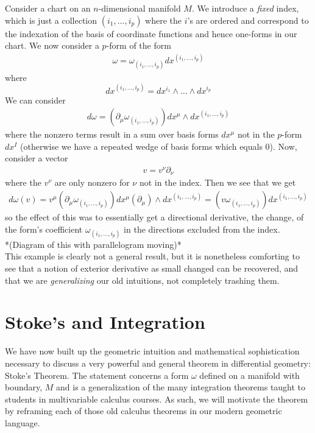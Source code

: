   Consider a chart on an $n$-dimensional manifold $M$.  We introduce a \textit{fixed} index, which is just a collection $(i_1, \dots, i_p)$ where the $i$'s are ordered and correspond to the indexation of the basis of coordinate functions and hence one-forms in our chart.  We now consider a $p$-form of the form
  \begin{align*}
  	\omega = \omega_{(i_1, \dots, i_p)} dx^{(i_1, \dots, i_p)}
  \end{align*}
  where 
  \begin{equation*}
  	dx^{(i_1, \dots, i_p)} = dx^{i_1}\wedge \dots \wedge dx^{i_p}
  \end{equation*}
  We can consider 
  \begin{align*}
  	d\omega = (\partial_\mu\omega_{(i_1, \dots, i_p)})dx^\mu \wedge dx^{(i_1, \dots, i_p)}
  \end{align*}
  where the nonzero terms result in a sum over basis forms $dx^\mu$ not in the $p$-form $dx^I$ (otherwise we have a repeated wedge of basis forms which equals 0).  Now, consider a vector 
  \begin{align*}
  	v = v^\nu\partial_\nu
  \end{align*}
 where the $v^\nu$ are only nonzero for $\nu$ not in the index.  Then we see that we get
 \begin{align*}
 	d\omega(v) = v^\mu(\partial_\mu \omega_{(i_1, \dots, i_p)})dx^\mu(\partial_\mu)\wedge dx^{(i_1, \dots, i_p)}  = (v \omega_{(i_1, \dots, i_p)})dx^{(i_1, \dots, i_p)}
 \end{align*}
 so the effect of this was to essentially get a directional derivative, the change, of the form's coefficient $\omega_{(i_1, \dots, i_p)}$ in the directions excluded from the index.\\   
 
 *(Diagram of this with parallelogram moving)*\\
 
 This example is clearly not a general result, but it is nonetheless comforting to see that a notion of exterior derivative as small changed can be recovered, and that we are \textit{generalizing} our old intuitions, not completely trashing them.\\
 

\section*{Stoke's and Integration}
We have now built up the geometric intuition and mathematical sophistication necessary to discuss a very powerful and general theorem in differential geometry: Stoke's Theorem.  The statement concerns a form $\omega$ defined on a manifold with boundary, $M$ and is a generalization of the many integration theorems taught to students in multivariable calculus courses.  As such, we will motivate the theorem by reframing each of those old calculus theorems in our modern geometric language.  

